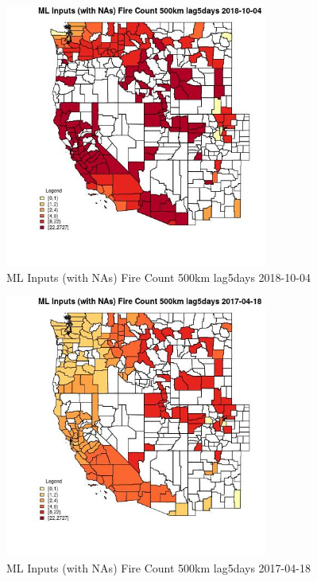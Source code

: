 \begin{figure} 
\centering  
\includegraphics[width=0.77\textwidth]{Code_Outputs/Report_ML_input_PM25_Step4_part_f_de_duplicated_aveswNAs_CountyFire_Count_500km_lag5daysMean2018-10-04.jpg} 
\caption{\label{fig:Report_ML_input_PM25_Step4_part_f_de_duplicated_aveswNAsCountyFire_Count_500km_lag5daysMean2018-10-04}ML Inputs (with NAs) Fire Count 500km lag5days 2018-10-04} 
\end{figure} 
 

\begin{figure} 
\centering  
\includegraphics[width=0.77\textwidth]{Code_Outputs/Report_ML_input_PM25_Step4_part_f_de_duplicated_aveswNAs_CountyFire_Count_500km_lag5daysMean2017-04-18.jpg} 
\caption{\label{fig:Report_ML_input_PM25_Step4_part_f_de_duplicated_aveswNAsCountyFire_Count_500km_lag5daysMean2017-04-18}ML Inputs (with NAs) Fire Count 500km lag5days 2017-04-18} 
\end{figure} 
 

